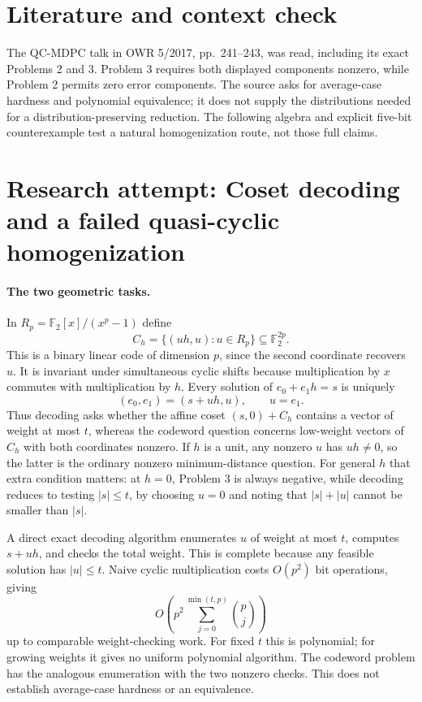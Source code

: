 \documentclass[11pt]{article}
\begin{document}
\section{Literature and context check}
The QC-MDPC talk in OWR 5/2017, pp.~241--243, was read, including its exact Problems 2 and 3. Problem 3 requires both displayed components nonzero, while Problem 2 permits zero error components. The source asks for average-case hardness and polynomial equivalence; it does not supply the distributions needed for a distribution-preserving reduction. The following algebra and explicit five-bit counterexample test a natural homogenization route, not those full claims.
\section{Research attempt: Coset decoding and a failed quasi-cyclic homogenization}

\paragraph{The two geometric tasks.}
In $R_p=\mathbb F_2[x]/(x^p-1)$ define
\[
 C_h=\{(uh,u):u\in R_p\}\subseteq\mathbb F_2^{2p}.
\]
This is a binary linear code of dimension $p$, since the second coordinate recovers $u$. It is invariant under simultaneous cyclic shifts because multiplication by $x$ commutes with multiplication by $h$. Every solution of $e_0+e_1h=s$ is uniquely
\[
 (e_0,e_1)=(s+uh,u),\qquad u=e_1.
\]
Thus decoding asks whether the affine coset $(s,0)+C_h$ contains a vector of weight at most $t$, whereas the codeword question concerns low-weight vectors of $C_h$ with both coordinates nonzero. If $h$ is a unit, any nonzero $u$ has $uh\ne0$, so the latter is the ordinary nonzero minimum-distance question. For general $h$ that extra condition matters: at $h=0$, Problem 3 is always negative, while decoding reduces to testing $|s|\le t$, by choosing $u=0$ and noting that $|s|+|u|$ cannot be smaller than $|s|$.

A direct exact decoding algorithm enumerates $u$ of weight at most $t$, computes $s+uh$, and checks the total weight. This is complete because any feasible solution has $|u|\le t$. Naive cyclic multiplication costs $O(p^2)$ bit operations, giving
\[
 O\left(p^2\sum_{j=0}^{\min(t,p)}\binom pj\right)
\]
up to comparable weight-checking work. For fixed $t$ this is polynomial; for growing weights it gives no uniform polynomial algorithm. The codeword problem has the analogous enumeration with the two nonzero checks. This does not establish average-case hardness or an equivalence.
\end{document}
